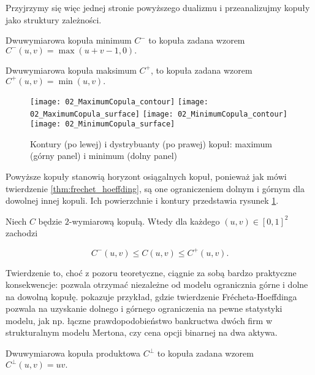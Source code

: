Przyjrzymy się więc jednej stronie powyższego dualizmu i przeanalizujmy kopuły jako struktury zależności.

\begin{df}
	Dwuwymiarowa kopuła minimum $C^{-}$ to kopuła zadana wzorem $C^{-}(u, v) = \max(u+v-1, 0).$
\end{df}
\begin{df}
	Dwuwymiarowa kopuła maksimum $C^{+}$, to kopuła zadana wzorem $C^{+}(u, v) = \min(u, v).$
\end{df}

\begin{figure}[h]
	\centering
	\texttt{[image: 02\_MaximumCopula\_contour]}
	\texttt{[image: 02\_MaximumCopula\_surface]}
	\texttt{[image: 02\_MinimumCopula\_contour]}
	\texttt{[image: 02\_MinimumCopula\_surface]}
	
	\caption{Kontury (po lewej) i dystrybuanty (po prawej) kopuł: maximum (górny panel) i minimum (dolny panel)\label{fig:minmax_copula}}
\end{figure}

Powyższe kopuły stanowią horyzont osiągalnych kopuł, ponieważ jak mówi twierdzenie \ref{thm:frechet_hoeffding}, są one ograniczeniem dolnym i górnym dla dowolnej innej kopuli. Ich powierzchnie i kontury przedstawia rysunek \ref{fig:minmax_copula}. 

\begin{thm}
	Niech $C$ będzie $2$-wymiarową kopułą. Wtedy dla każdego $(u, v)\in[0, 1]^2$ zachodzi
	
	$$ C^{-}(u, v) \leqslant C(u, v) \leqslant C^{+}(u, v).$$
	
	\label{thm:frechet_hoeffding}
\end{thm}

Twierdzenie to, choć z pozoru teoretyczne, ciągnie za sobą bardzo praktyczne konsekwencje: pozwala otrzymać niezależne od modelu ogranicznia górne i dolne na dowolną kopułę. \cite{Cherubini_Copula_Methods_in_Finance} pokazuje przykład, gdzie twierdzenie Frécheta-Hoeffdinga pozwala na uzyskanie dolnego i górnego ograniczenia na pewne statystyki modelu, jak np. łączne prawdopodobieństwo bankructwa dwóch firm w strukturalnym modelu Mertona, czy cena opcji binarnej na dwa aktywa.\\

\begin{df}
	Dwuwymiarowa kopuła produktowa $C^{\perp}$ to kopuła zadana wzorem $C^{\perp}(u, v) = uv.$
\end{df}


